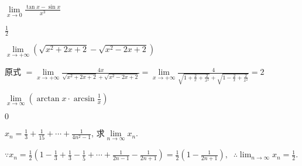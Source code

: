 \begin{problem} 
	$\displaystyle \lim\limits_{x \rightarrow 0}\frac{\tan x - \sin x}{x^{3}}$
	
\begin{solution} 
	$\displaystyle \frac{1}{2}$
\end{solution}
\end{problem}          
 
 \begin{problem}
 	$\displaystyle \lim\limits_{x \rightarrow + \infty}(\sqrt{x^{2} + 2x + 2} - \sqrt{x^{2} - 2x + 2})$

\begin{solution}
原式 $\displaystyle {= \lim\limits_{x \rightarrow + \infty}\frac{4x}{\sqrt{x^{2} + 2x + 2} + \sqrt{x^{2} - 2x + 2}}
}{= \lim\limits_{x \rightarrow + \infty}\frac{4}{\sqrt{1 + \frac{2}{x} + \frac{2}{x^{2}}} + \sqrt{1 - \frac{2}{x} + \frac{2}{x^{2}}}}
}{= 2}$
\end{solution}


\end{problem}           

\begin{problem}
$\lim\limits_{x \rightarrow \infty}\left( \arctan x \cdot \arcsin\frac{1}{x} \right)$

\begin{solution} 
$0$
\end{solution}


\end{problem}           


\begin{problem}
	$\displaystyle x_{n} = \frac{1}{3} + \frac{1}{15} + \cdots + \frac{1}{4n^{2} - 1}$, 求$\lim\limits_{n \rightarrow \infty}x_{n}$.

\begin{solution}
$\displaystyle \because x_{n}=\frac{1}{2}\left(1-\frac{1}{3}+\frac{1}{3}-\frac{1}{5}+\cdots+\frac{1}{2 n-1}-\frac{1}{2 n+1}\right)=\frac{1}{2}\left(1-\frac{1}{2 n+1}\right), \ $
$\displaystyle \therefore \lim _{n \rightarrow \infty} x_{n}=\frac{1}{2}.$
\end{solution}


\end{problem}           


